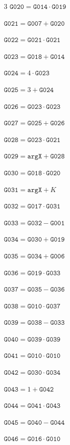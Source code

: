 \documentclass[10pt]{article}
\begin{document}
\begin{multicols}{3}
\noindent $\mathtt{G020}=\mathtt{G014}\cdot \mathtt{G019}$\par
\noindent $\mathtt{G021}=\mathtt{G007}+\mathtt{G020}$\par
\noindent $\mathtt{G022}=\mathtt{G021}\cdot \mathtt{G021}$\par
\noindent $\mathtt{G023}=\mathtt{G018}+\mathtt{G014}$\par
\noindent $\mathtt{G024}=4\cdot \mathtt{G023}$\par
\noindent $\mathtt{G025}=3+\mathtt{G024}$\par
\noindent $\mathtt{G026}=\mathtt{G023}\cdot \mathtt{G023}$\par
\noindent $\mathtt{G027}=\mathtt{G025}+\mathtt{G026}$\par
\noindent $\mathtt{G028}=\mathtt{G023}\cdot \mathtt{G021}$\par
\noindent $\mathtt{G029}=\mathtt{argX}+\mathtt{G028}$\par
\noindent $\mathtt{G030}=\mathtt{G018}\cdot \mathtt{G020}$\par
\noindent $\mathtt{G031}=\mathtt{argX}+K$\par
\noindent $\mathtt{G032}=\mathtt{G017}\cdot \mathtt{G031}$\par
\noindent $\mathtt{G033}=\mathtt{G032}-\mathtt{G001}$\par
\noindent $\mathtt{G034}=\mathtt{G030}+\mathtt{G019}$\par
\noindent $\mathtt{G035}=\mathtt{G034}+\mathtt{G006}$\par
\noindent $\mathtt{G036}=\mathtt{G019}\cdot \mathtt{G033}$\par
\noindent $\mathtt{G037}=\mathtt{G035}-\mathtt{G036}$\par
\noindent $\mathtt{G038}=\mathtt{G010}\cdot \mathtt{G037}$\par
\noindent $\mathtt{G039}=\mathtt{G038}-\mathtt{G033}$\par
\noindent $\mathtt{G040}=\mathtt{G039}\cdot \mathtt{G039}$\par
\noindent $\mathtt{G041}=\mathtt{G010}\cdot \mathtt{G010}$\par
\noindent $\mathtt{G042}=\mathtt{G030}\cdot \mathtt{G034}$\par
\noindent $\mathtt{G043}=1+\mathtt{G042}$\par
\noindent $\mathtt{G044}=\mathtt{G041}\cdot \mathtt{G043}$\par
\noindent $\mathtt{G045}=\mathtt{G040}-\mathtt{G044}$\par
\noindent $\mathtt{G046}=\mathtt{G016}\cdot \mathtt{G010}$\par

\end{multicols}
\end{document}
